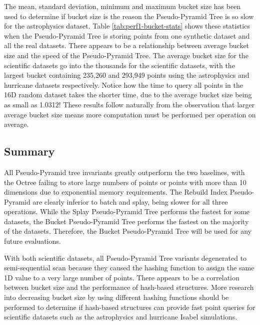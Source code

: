 The mean, standard deviation, minimum and maximum bucket size has been used to determine if bucket size is the reason the Pseudo-Pyramid Tree is so slow for the astrophysics dataset. Table \ref{tab:perf1-bucket-stats} shows these statistics when the Pseudo-Pyramid Tree is storing points from one synthetic dataset and all the real datasets. There appears to be a relationship between average bucket size and the speed of the Pseudo-Pyramid Tree. The average bucket size for the scientific datasets go into the thousands for the scientific datasets, with the largest bucket containing 235,260 and 293,949 points using the astrophysics and hurricane datasets respectively. Notice how the time to query all points in the 16D random dataset takes the shorter time, due to the average bucket size being as small as 1.0312! These results follow naturally from the observation that larger average bucket size means more computation must be performed per operation on average.

\subsection{Summary}

All Pseudo-Pyramid tree invariants greatly outperform the two baselines, with the Octree failing to store large numbers of points or points with more than 10 dimensions due to exponential memory requirements. The Rebuild Index Pseudo-Pyramid are clearly inferior to batch and splay, being slower for all three operations. While the Splay Pseudo-Pyramid Tree performs the fastest for some datasets, the Bucket Pseudo-Pyramid Tree performs the fastest on the majority of the datasets. Therefore, the Bucket Pseudo-Pyramid Tree will be used for any future evaluations.

With both scientific datasets, all Pseudo-Pyramid Tree variants degenerated to semi-sequential scan because they caused the hashing function to assign the same 1D value to a very large number of points. There appears to be a correlation between bucket size and the performance of hash-based structures. More research into decreasing bucket size by using different hashing functions should be performed to determine if hash-based structures can provide fast point queries for scientific datasets such as the astrophysics and hurricane Isabel simulations.